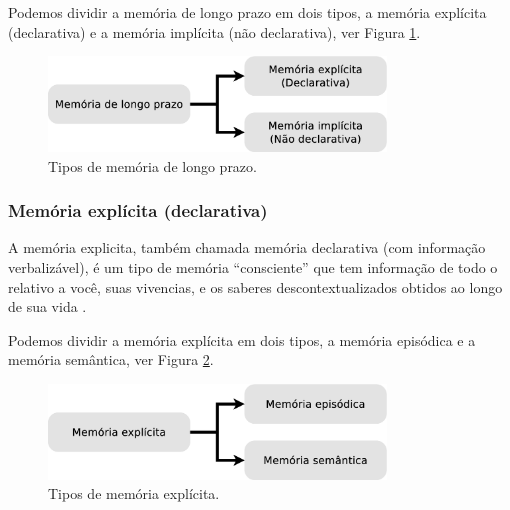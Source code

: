 Podemos dividir a memória de longo prazo em dois tipos, 
a memória explícita (declarativa) e 
a memória implícita (não declarativa), ver Figura \ref{fig:implicito-explicito}.
\begin{figure}[!h]
  \centering
    \includegraphics[width=0.8\textwidth]{chapters/cap-learning/memory-mlp.eps} 
  \caption{Tipos de  memória de longo prazo.}
\label{fig:implicito-explicito}
\end{figure}

\subsubsection{Memória explícita (declarativa)} 
\label{subsubsec:explicita}
A memória explicita, também chamada memória declarativa (com informação verbalizável),
é um tipo de memória ``consciente'' que tem informação de todo o relativo a você, 
suas vivencias, e os saberes descontextualizados obtidos ao longo de sua vida
\cite[pp. 138]{pake2019psicologia}.

Podemos dividir a memória explícita em dois tipos, 
a memória episódica e 
a memória semântica, ver Figura \ref{fig:semantica-episodica}.
\begin{figure}[!h]
  \centering
    \includegraphics[width=0.8\textwidth]{chapters/cap-learning/memory-explicita.eps} 
  \caption{Tipos de  memória explícita.}
\label{fig:semantica-episodica}
\end{figure}

